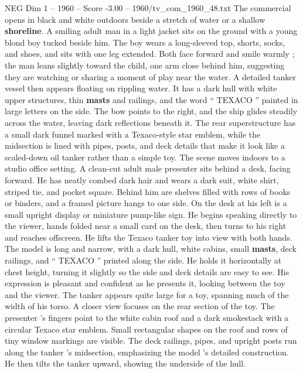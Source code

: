 \begin{textsample}{NEG Dim 1 – 1960 – Score -3.00 – 1960/tv\_com\_1960\_48.txt}  \label{ex:f1_neg_027}
The commercial opens in black and white outdoors beside a stretch of water or a shallow \textbf{shoreline}.
A smiling adult man in a light jacket sits on the ground with a young blond boy tucked beside him.
The boy wears a long-sleeved top, shorts, socks, and shoes, and sits with one leg extended.
Both face forward and smile warmly ; the man leans slightly toward the child, one arm close behind him, suggesting they are watching or sharing a moment of play near the water.
A detailed tanker vessel then appears floating on rippling water.
It has a dark hull with white upper structures, thin \textbf{masts} and railings, and the word “ TEXACO ” painted in large letters on the side.
The bow points to the right, and the ship glides steadily across the water, leaving dark reflections beneath it.
The rear superstructure has a small dark funnel marked with a Texaco-style star emblem, while the midsection is lined with pipes, posts, and deck details that make it look like a scaled-down oil tanker rather than a simple toy.
The scene moves indoors to a studio office setting.
A clean-cut adult male presenter sits behind a desk, facing forward.
He has neatly combed dark hair and wears a dark suit, white shirt, striped tie, and pocket square.
Behind him are shelves filled with rows of books or binders, and a framed picture hangs to one side.
On the desk at his left is a small upright display or miniature pump-like sign.
He begins speaking directly to the viewer, hands folded near a small card on the desk, then turns to his right and reaches offscreen.
He lifts the Texaco tanker toy into view with both hands.
The model is long and narrow, with a dark hull, white cabins, small \textbf{masts}, deck railings, and “ TEXACO ” printed along the side.
He holds it horizontally at chest height, turning it slightly so the side and deck details are easy to see.
His expression is pleasant and confident as he presents it, looking between the toy and the viewer.
The tanker appears quite large for a toy, spanning much of the width of his torso.
A closer view focuses on the rear section of the toy.
The presenter ’s fingers point to the white cabin roof and a dark smokestack with a circular Texaco star emblem.
Small rectangular shapes on the roof and rows of tiny window markings are visible.
The deck railings, pipes, and upright posts run along the tanker ’s midsection, emphasizing the model ’s detailed construction.
He then tilts the tanker upward, showing the underside of the hull.

\end{textsample}
